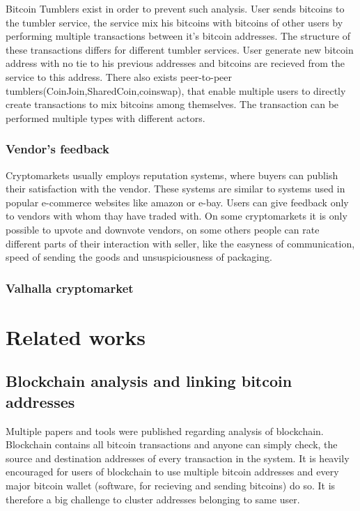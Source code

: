 \documentclass[
  digital, %
  table,   %
  lof,     %
  lot,     %
  oneside
]{fithesis3}
\begin{document}
Bitcoin Tumblers exist in order to prevent such analysis. User sends bitcoins to the tumbler service, the service mix his bitcoins
with bitcoins of other users by performing multiple transactions between it's bitcoin addresses.
The structure of these transactions differs for different tumbler services.
User generate new bitcoin address with no tie to his previous addresses and bitcoins are recieved from the service to this address.
 There also exists peer-to-peer tumblers(CoinJoin,SharedCoin,coinswap),
that enable multiple users to directly create transactions to mix bitcoins among themselves.
The transaction can be performed multiple types with different actors.

\subsection{Vendor's feedback}

Cryptomarkets usually employs reputation systems, where buyers can publish their satisfaction with the vendor.
These systems are similar to systems used in popular e-commerce websites like amazon or e-bay.
Users can give feedback only to vendors with whom thay have traded with.
On some cryptomarkets it is only possible to upvote and downvote vendors, on some others people can
rate different parts of their interaction with seller, like the easyness of communication,
speed of sending the goods and unsuspiciousness of packaging.

\subsection{Valhalla cryptomarket}

\chapter{Related works}
\section{Blockchain analysis and linking bitcoin addresses}

Multiple papers and tools were published regarding analysis of blockchain.
Blockchain contains all bitcoin transactions and anyone can simply check,
the source and destination addresses of every transaction in the system.
It is heavily encouraged for users of blockchain to use multiple bitcoin addresses
 and every major bitcoin wallet (software, for recieving and sending bitcoins) do so.
 It is therefore a big challenge to cluster addresses belonging to same user.
 
\end{document}
